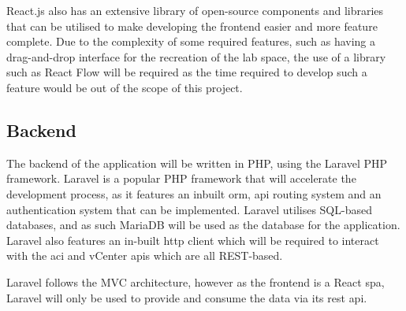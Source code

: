 React.js also has an extensive library of open-source components and libraries that can be utilised to make developing the frontend easier and more feature complete. Due to the complexity of some required features, such as having a drag-and-drop interface for the recreation of the lab space, the use of a library such as React Flow will be required as the time required to develop such a feature would be out of the scope of this project.

\subsection{Backend}
\label{design:web-application:backend}
The backend of the application will be written in PHP, using the Laravel PHP framework. Laravel is a popular PHP framework that will accelerate the development process, as it features an inbuilt \gls{orm}, \gls{api} routing system and an authentication system that can be implemented. Laravel utilises SQL-based databases, and as such MariaDB will be used as the database for the application. Laravel also features an in-built \gls{http} client which will be required to interact with the \gls{aci} and vCenter \gls{api}s which are all REST-based.

Laravel follows the MVC architecture, however as the frontend is a React \gls{spa}, Laravel will only be used to provide and consume the data via its \gls{rest} \gls{api}.
